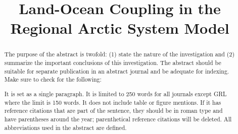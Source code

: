 \documentclass[jgrga, draft]{agutex}
\begin{document}
%
%


\title{Land-Ocean Coupling in the Regional Arctic System Model}

%
%







%
%


\begin{abstract}
The purpose of the abstract is twofold: (1) state the nature of the investigation and (2) summarize the important conclusions of this investigation. The abstract should be suitable for separate publication in an abstract journal and be adequate for indexing. Make sure to check for the following:

It is set as a single paragraph.
It is limited to 250 words for all journals except GRL where the limit is 150 words.
It does not include table or figure mentions.
If it has reference citations that are part of the sentence, they should be in roman type and have parentheses around the year; parenthetical reference citations will be deleted.
All abbreviations used in the abstract are defined.
\end{abstract}

%
%
\end{document}
